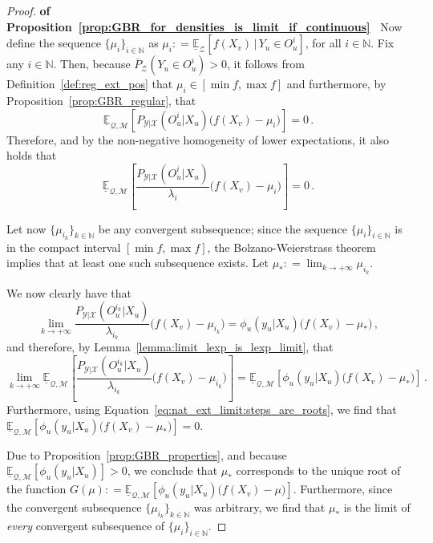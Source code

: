 \documentclass[twoside,11pt]{article}
\newcommand{\nats}{\mathbb{N}}
\newcommand{\states}{\mathcal{X}}
\newcommand{\observs}{\mathcal{Y}}
\newcommand{\lexp}{\underline{\mathbb{E}}_{\rateset,\mathcal{M}}}
\newcommand{\rateset}{\mathcal{Q}}
\newcommand{\coloneqq}{:\!=}
\begin{document}
\begin{proof}{\bf of Proposition~\ref{prop:GBR_for_densities_is_limit_if_continuous}~}
Now define the sequence $\{\mu_i\}_{i\in\nats}$ as $\mu_i\coloneqq \underline{\mathbb{E}}_\mathcal{Z}[f(X_v)\,\vert\,Y_u\in O_u^i]$, for all $i\in\nats$.
Fix any $i\in\nats$. Then, because $\overline{P}_{\mathcal{Z}}(Y_u\in O_u^i)>0$, it follows from Definition~\ref{def:reg_ext_pos} that $\mu_i\in[\min f, \max f]$ and furthermore, by Proposition~\ref{prop:GBR_regular}, that
\begin{equation*}
\lexp[P_{\observs\vert\states}(O_u^i\vert X_u)\bigl(f(X_v) - \mu_i\bigr)] = 0\,.
\end{equation*}
Therefore, and by the non-negative homogeneity of lower expectations, it also holds that
\begin{equation}\label{eq:nat_ext_limit:steps_are_roots}
\lexp\left[\frac{P_{\observs\vert\states}(O_u^i\vert X_u)}{\lambda_i}\bigl(f(X_v) - \mu_i\bigr)\right] = 0\,.
\end{equation}

Let now $\{\mu_{i_k}\}_{k\in\nats}$ be any convergent subsequence; since the sequence $\{\mu_i\}_{i\in\nats}$ is in the compact interval $[\min f,\max f]$, the Bolzano-Weierstrass theorem implies that at least one such subsequence exists. Let $\mu_{*}\coloneqq \lim_{k\to+\infty}\mu_{i_k}$.

We now clearly have that
\begin{equation*}
\lim_{k\to+\infty} \frac{P_{\observs\vert\states}(O_u^{i_k}\vert X_u)}{\lambda_{i_k}}\bigl(f(X_v) - \mu_{i_k}\bigr) = \phi_u(y_u\vert X_u)\bigl(f(X_v) - \mu_{*}\bigr)\,,
\end{equation*}
and therefore, by Lemma~\ref{lemma:limit_lexp_is_lexp_limit}, that
\begin{equation*}
\lim_{k\to+\infty} \lexp\left[\frac{P_{\observs\vert\states}(O_u^{i_k}\vert X_u)}{\lambda_{i_k}}\bigl(f(X_v) - \mu_{i_k}\bigr)\right] = \lexp\left[\phi_u(y_u\vert X_u)\bigl(f(X_v) - \mu_{*}\bigr)\right]\,.
\end{equation*}
Furthermore, using Equation~\eqref{eq:nat_ext_limit:steps_are_roots}, we find that $\lexp\left[\phi_u(y_u\vert X_u)\bigl(f(X_v) - \mu_{*}\bigr)\right] = 0$.

Due to Proposition~\ref{prop:GBR_properties}, and because $\lexp[\phi_u(y_u\vert X_u)]>0$, we conclude that $\mu_{*}$ corresponds to the unique root of the function $G(\mu)\coloneqq \lexp\left[\phi_u(y_u\vert X_u)\bigl(f(X_v) - \mu\bigr)\right]$. Furthermore, since the convergent subsequence $\{\mu_{i_k}\}_{k\in\nats}$ was arbitrary, we find that $\mu_*$ is the limit of \emph{every} convergent subsequence of $\{\mu_i\}_{i\in\nats}$.


\end{proof}
\end{document}
